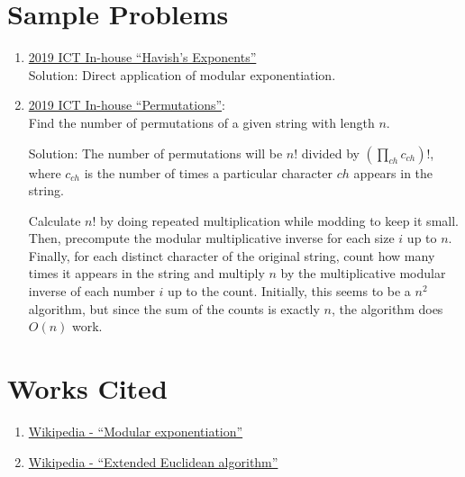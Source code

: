 \documentclass[11pt, oneside]{article}
\begin{document}
\section{Sample Problems}

\begin{enumerate}
  \item \href{https://codeforces.com/group/M4wsRWBHyZ/contest/238084/problem/E}{2019 ICT In-house ``Havish's Exponents''} \\
  Solution: Direct application of modular exponentiation.

  \item \href{https://codeforces.com/group/M4wsRWBHyZ/contest/238084/problem/G}{2019 ICT In-house ``Permutations''}: \\
  Find the number of permutations of a given string with length \( n \).

  Solution: The number of permutations will be \( n! \) divided by \( (\prod_{ch} c_{ch})! \), where
  \( c_{ch} \) is the number of times a particular character \( ch \) appears in the string.

  Calculate \( n! \) by doing repeated multiplication while modding to keep it small. Then, precompute
  the modular multiplicative inverse for each size \( i \) up to \( n \). Finally, for each distinct
  character of the original string, count how many times it appears in the string and multiply \( n \)
  by the multiplicative modular inverse of each number \( i \) up to the count. Initially, this seems to be a \( n^2 \) algorithm, but since the sum of the counts is exactly \( n \), the algorithm does \( O(n) \) work.

\end{enumerate}

\section{Works Cited}

\begin{enumerate}
  \item \href{https://en.wikipedia.org/wiki/Modular_exponentiation}{Wikipedia - ``Modular exponentiation''}
  \item \href{https://en.wikipedia.org/wiki/Extended_Euclidean_algorithm}{Wikipedia - ``Extended Euclidean algorithm''}
\end{enumerate}
\end{document}
